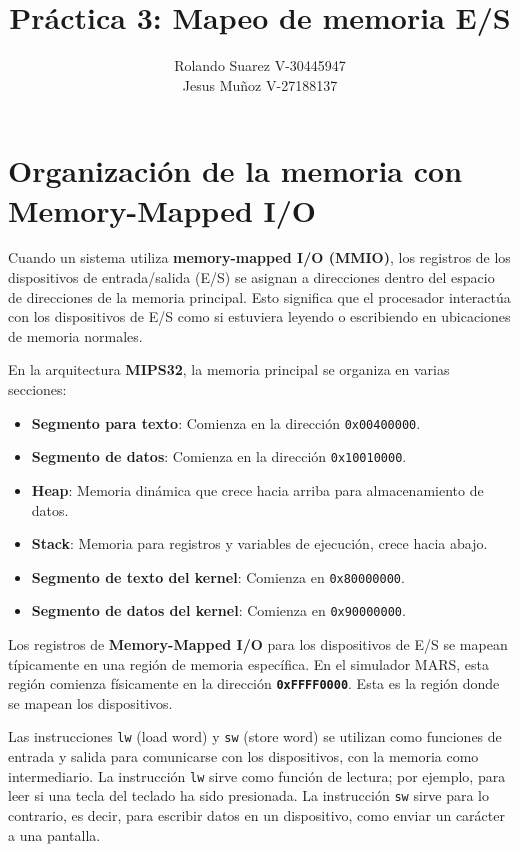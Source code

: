 \documentclass{article}
\title{Práctica 3: Mapeo de memoria E/S}
\author{Rolando Suarez V-30445947 \\
		Jesus Muñoz V-27188137}
\date{}
\begin{document}
	
	\maketitle
	
	
	\section{Organización de la memoria con Memory-Mapped I/O}
	
	Cuando un sistema utiliza \textbf{memory-mapped I/O (MMIO)}, los registros de los dispositivos de entrada/salida (E/S) se asignan a direcciones dentro del espacio de direcciones de la memoria principal. Esto significa que el procesador interactúa con los dispositivos de E/S como si estuviera leyendo o escribiendo en ubicaciones de memoria normales.
	
	En la arquitectura \textbf{MIPS32}, la memoria principal se organiza en varias secciones:
	\begin{itemize}
		\item \textbf{Segmento para texto}: Comienza en la dirección \texttt{0x00400000}.
		\item \textbf{Segmento de datos}: Comienza en la dirección \texttt{0x10010000}.
		\item \textbf{Heap}: Memoria dinámica que crece hacia arriba para almacenamiento de datos.
		\item \textbf{Stack}: Memoria para registros y variables de ejecución, crece hacia abajo.
		\item \textbf{Segmento de texto del kernel}: Comienza en \texttt{0x80000000}.
		\item \textbf{Segmento de datos del kernel}: Comienza en \texttt{0x90000000}.
	\end{itemize}
	
	Los registros de \textbf{Memory-Mapped I/O} para los dispositivos de E/S se mapean típicamente en una región de memoria específica. En el simulador MARS, esta región comienza físicamente en la dirección \textbf{\texttt{0xFFFF0000}}. Esta es la región donde se mapean los dispositivos.
	
	Las instrucciones \texttt{lw} (load word) y \texttt{sw} (store word) se utilizan como funciones de entrada y salida para comunicarse con los dispositivos, con la memoria como intermediario. La instrucción \texttt{lw} sirve como función de lectura; por ejemplo, para leer si una tecla del teclado ha sido presionada. La instrucción \texttt{sw} sirve para lo contrario, es decir, para escribir datos en un dispositivo, como enviar un carácter a una pantalla.
	
\end{document}
